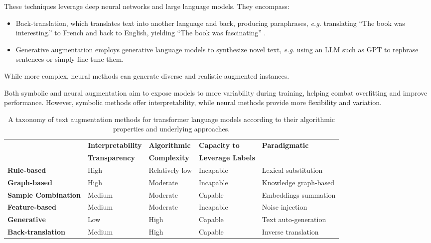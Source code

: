 These techniques leverage deep neural networks and large language models. They encompass:   

\begin{itemize}    
   \item Back-translation, which translates text into another language and back, producing paraphrases, \textit{e.g.} translating ``The book was interesting.'' to French and back to English, yielding  ``The book was fascinating'' \cite{pham_meta_2021}.
  \item Generative augmentation employs generative language models to synthesize novel text, \textit{e.g.} using an \ac{LLM} such as GPT to rephrase sentences or simply fine-tune them.
\end{itemize} 

While more complex, neural methods can generate diverse and realistic augmented instances.

Both symbolic and neural augmentation aim to expose models to more variability during training, helping combat overfitting and improve performance. However, symbolic methods offer interpretability, while neural methods provide more flexibility and variation.

\begin{table}[ht]
\centering
\caption{A taxonomy of text augmentation methods for transformer language models according to their algorithmic properties and underlying approaches.}  
\begin{tabularx}{\textwidth}{|X|X|X|X|X|}   
\hline
  &\textbf{Interpretability} &\textbf{Algorithmic }   & \textbf{Capacity to} &\textbf{Paradigmatic} \\
 &\textbf{Transparency} & \textbf{Complexity}& \textbf{Leverage Labels} &\\[0.5ex] 
\hline
\textbf{Rule-based} & High &Relatively low &Incapable& Lexical substitution \\   
\hline
\textbf{Graph-based} &High & Moderate & Incapable&Knowledge graph-based\\       
\hline      
\textbf{Sample Combination} &Medium&Moderate & Capable& Embeddings summation\\
 \hline    
\textbf{Feature-based}&Medium &Moderate& Incapable &Noise injection\\     
\hline
\textbf{Generative}&Low &High &Capable &Text auto-generation\\    
\hline
\textbf{Back-translation}&Medium &High&Capable &Inverse translation\\             
\hline           
\end{tabularx}
\label{tab:textaugmethods}  
\end{table}

